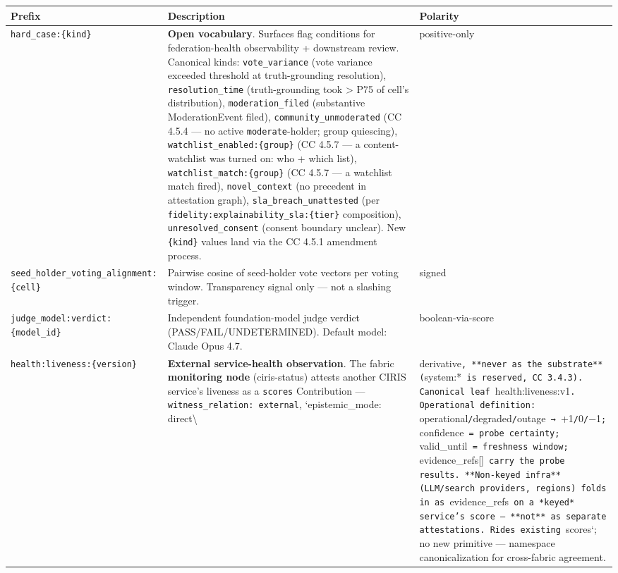 \documentclass[11pt]{article}
\begin{document}
{\footnotesize
\begin{longtable}{|p{5.33cm}|p{5.33cm}|p{5.33cm}|}\hline
\textbf{Prefix} & \textbf{Description} & \textbf{Polarity} \\ \hline\endhead
\texttt{hard\_case:\{kind\}} & \textbf{Open vocabulary}. Surfaces flag conditions for federation-health observability + downstream review. Canonical kinds: \texttt{vote\_variance} (vote variance exceeded threshold at truth-grounding resolution), \texttt{resolution\_time} (truth-grounding took > P75 of cell's distribution), \texttt{moderation\_filed} (substantive ModerationEvent filed), \texttt{community\_unmoderated} (CC 4.5.4 — no active \texttt{moderate}-holder; group quiescing), \texttt{watchlist\_enabled:\{group\}} (CC 4.5.7 — a content-watchlist was turned on: who + which list), \texttt{watchlist\_match:\{group\}} (CC 4.5.7 — a watchlist match fired), \texttt{novel\_context} (no precedent in attestation graph), \texttt{sla\_breach\_unattested} (per \texttt{fidelity:explainability\_sla:\{tier\}} composition), \texttt{unresolved\_consent} (consent boundary unclear). New \texttt{\{kind\}} values land via the CC 4.5.1 amendment process. & positive-only \\ \hline
\texttt{seed\_holder\_voting\_alignment:\{cell\}} & Pairwise cosine of seed-holder vote vectors per voting window. Transparency signal only — not a slashing trigger. & signed \\ \hline
\texttt{judge\_model:verdict:\{model\_id\}} & Independent foundation-model judge verdict (PASS/FAIL/UNDETERMINED). Default model: Claude Opus 4.7. & boolean-via-score \\ \hline
\texttt{health:liveness:\{version\}} & \textbf{External service-health observation}. The fabric \textbf{monitoring node} (ciris-status) attests another CIRIS service's liveness as a \texttt{scores} Contribution — \texttt{witness\_relation: external}, `epistemic\_mode: direct\textbackslash{} & derivative\texttt{, **never as the substrate** (}system:*\texttt{ is reserved, CC 3.4.3). Canonical leaf }health:liveness:v1\texttt{. Operational definition: }operational\texttt{/}degraded\texttt{/}outage\texttt{ → }+1\texttt{/}0\texttt{/}−1\texttt{; }confidence\texttt{ = probe certainty; }valid\_until\texttt{ = freshness window; }evidence\_refs[]\texttt{ carry the probe results. **Non-keyed infra** (LLM/search providers, regions) folds in as }evidence\_refs\texttt{ on a *keyed* service's score — **not** as separate attestations. Rides existing }scores`; no new primitive — namespace canonicalization for cross-fabric agreement. \\ \hline

\end{longtable}}
\end{document}
